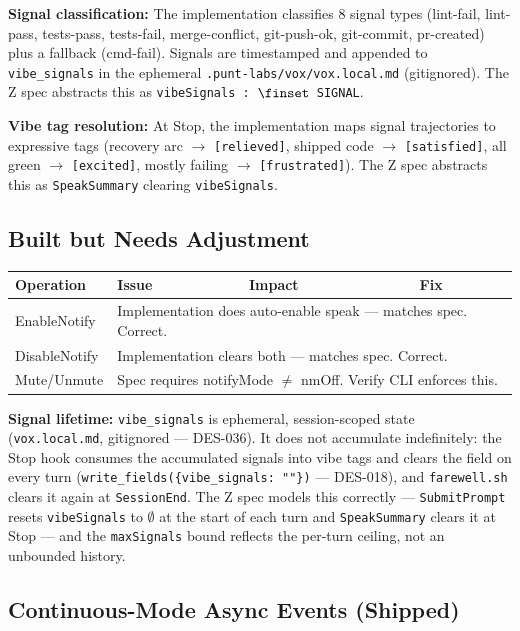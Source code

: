 \documentclass[a4paper,10pt,fleqn]{article}
\begin{document}
\textbf{Signal classification:} The implementation classifies 8 signal
types (lint-fail, lint-pass, tests-pass, tests-fail, merge-conflict,
git-push-ok, git-commit, pr-created) plus a fallback (cmd-fail). Signals
are timestamped and appended to \texttt{vibe\_signals} in the ephemeral
\texttt{.punt-labs/vox/vox.local.md} (gitignored). The Z spec abstracts
this as \texttt{vibeSignals : $\finset$ SIGNAL}.

\textbf{Vibe tag resolution:} At Stop, the implementation maps signal
trajectories to expressive tags (recovery arc $\to$ \texttt{[relieved]},
shipped code $\to$ \texttt{[satisfied]}, all green $\to$
\texttt{[excited]}, mostly failing $\to$ \texttt{[frustrated]}). The Z
spec abstracts this as \texttt{SpeakSummary} clearing
\texttt{vibeSignals}.

\subsection{Built but Needs Adjustment}

\begin{tabular}{llll}
\hline
\textbf{Operation} & \textbf{Issue} & \textbf{Impact} & \textbf{Fix} \\
\hline
EnableNotify & \multicolumn{3}{l}{Implementation does auto-enable speak --- matches spec. Correct.} \\
DisableNotify & \multicolumn{3}{l}{Implementation clears both --- matches spec. Correct.} \\
Mute/Unmute & \multicolumn{3}{l}{Spec requires notifyMode $\neq$ nmOff. Verify CLI enforces this.} \\
\hline
\end{tabular}

\textbf{Signal lifetime:} \texttt{vibe\_signals} is ephemeral,
session-scoped state (\texttt{vox.local.md}, gitignored --- DES-036). It
does not accumulate indefinitely: the Stop hook consumes the accumulated
signals into vibe tags and clears the field on every turn
(\texttt{write\_fields(\{vibe\_signals: ""\})} --- DES-018), and
\texttt{farewell.sh} clears it again at \texttt{SessionEnd}. The Z spec
models this correctly --- \texttt{SubmitPrompt} resets
\texttt{vibeSignals} to $\emptyset$ at the start of each turn and
\texttt{SpeakSummary} clears it at Stop --- and the \texttt{maxSignals}
bound reflects the per-turn ceiling, not an unbounded history.

\subsection{Continuous-Mode Async Events (Shipped)}
\end{document}
